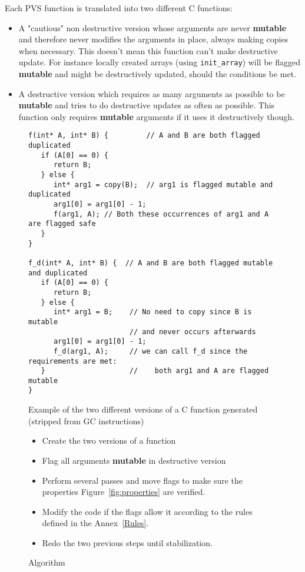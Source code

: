 \documentclass[12pt,a4paper]{article}
\newcommand{\cl}[1]{\texttt{#1}}
\newcommand{\bang}{ \textbf{ mutable } }
\begin{document}
Each PVS function is translated into two different C functions:
\begin{itemize}
\item A "cautious" non destructive version whose arguments are never \bang and therefore never modifies the arguments in place, always making copies when necessary. This doesn't mean this function can't make destructive update. For instance locally created arrays (using \cl{init\_array}) will be flagged \bang and might be destructively updated, should the conditions be met.
\item A destructive version which requires as many arguments as possible to be \bang and tries to do destructive updates as often as possible. This function only requires \bang arguments if it uses it destructively though.
\end{itemize}


\begin{figure}
\begin{lstlisting}
f(int* A, int* B) {         // A and B are both flagged duplicated
   if (A[0] == 0) {
      return B;
   } else {
      int* arg1 = copy(B);  // arg1 is flagged mutable and duplicated
      arg1[0] = arg1[0] - 1;
      f(arg1, A); // Both these occurrences of arg1 and A are flagged safe
   }
}

f_d(int* A, int* B) {  // A and B are both flagged mutable and duplicated
   if (A[0] == 0) {
      return B;
   } else {
      int* arg1 = B;    // No need to copy since B is mutable
                        // and never occurs afterwards
      arg1[0] = arg1[0] - 1;
      f_d(arg1, A);     // we can call f_d since the requirements are met:
   }                    //    both arg1 and A are flagged mutable
}
\end{lstlisting}
\caption{Example of the two different versions of a C function generated (stripped from GC instructions)}
\end{figure}




\begin{figure}
\begin{itemize}
\item Create the two versions of a function
\item Flag all arguments \bang in destructive version
\item Perform several passes and move flags to make sure the properties Figure~\ref{fig:properties} are verified.
\item Modify the code if the flags allow it according to the rules defined in the Annex~\ref{Rules}.
\item Redo the two previous steps until stabilization.
\end{itemize}
\caption{Algorithm}
\end{figure}
\end{document}
